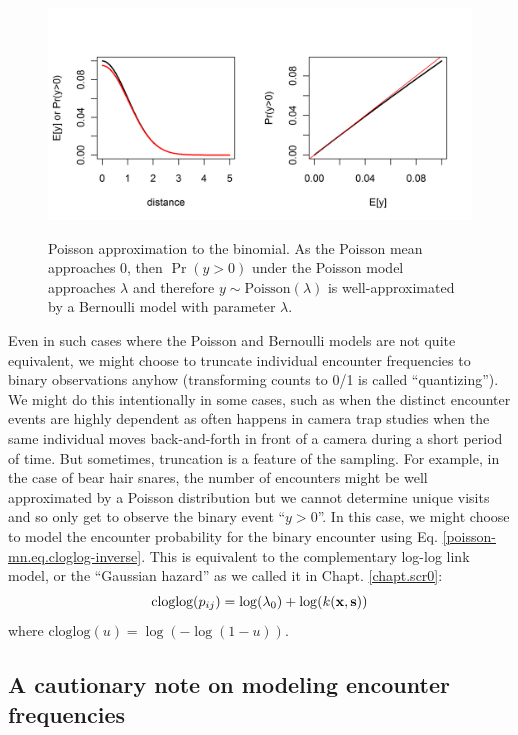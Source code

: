 \begin{figure}
\centering
\includegraphics[width=5in,height=2.5in]{Ch9-PoisMn/figs/Poisson-Bern.png}
\caption{
Poisson approximation to the binomial. As the Poisson mean
approaches 0, then $\Pr(y>0)$ under the Poisson model approaches
$\lambda$ and therefore $y \sim \mbox{Poisson}(\lambda)$ is
well-approximated by a Bernoulli model with parameter $\lambda$.  }
\label{poisson-mn.fig.poissonbern}
\end{figure}

Even in such cases where the Poisson and Bernoulli models are not
quite equivalent, we might choose to truncate individual encounter
frequencies to binary observations anyhow (transforming counts to 0/1
is called ``quantizing'').  We might do this intentionally in some
cases, such as when the distinct encounter events are highly dependent
as often happens in camera trap studies when the same individual moves
back-and-forth in front of a camera during a short period of time.
But sometimes, truncation is a feature of the sampling. For example,
in the case of bear hair snares, the number of encounters might be
well approximated by a Poisson distribution but we cannot determine
unique visits and so only get to observe the binary event ``$y>0$''.
In this case, we might choose to model the encounter probability for
the binary encounter using
 Eq. \ref{poisson-mn.eq.cloglog-inverse}.
This is equivalent to the complementary log-log link model, or the
``Gaussian hazard'' as we called it in Chapt. \ref{chapt.scr0}:
\[
\mbox{cloglog}(p_{ij}) = \log(\lambda_{0})  + \log(k({\bf x},{\bf s}))
\]
where $\mbox{cloglog}(u) = \log(-\log(1-u))$.


\subsection{A cautionary note on modeling encounter frequencies}

